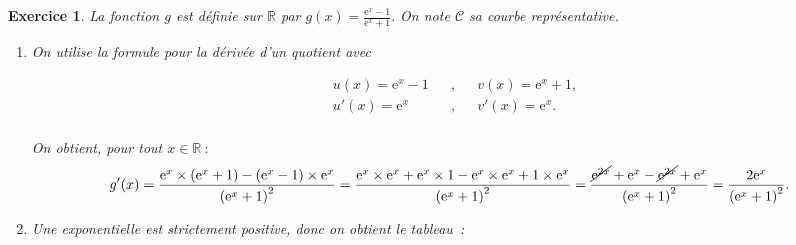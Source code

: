 \documentclass[10pt]{article}
\newtheorem{exo}{Exercice}
\begin{document}
\begin{exo}

La fonction $g$ est définie sur $\mathbb{R}$ par $g(x)=\frac{\text{e}^{x}-1}{\text{e}^{x}+1}.$ On note $\mathcal{C}$ sa courbe représentative.

\begin{enumerate}
\item On utilise la formule pour la dérivée d'un quotient avec

\begin{align*}
&u(x)=\text{e}^{x}-1&&,&& v(x)=\text{e}^{x}+1, \\
& u'(x)=\text{e}^{x}&&, &&v'(x)=\text{e}^{x}.\\
\end{align*}

On obtient, pour tout $x\in \mathbb{R}~:$
\[g'(x)=\frac{\text{e}^{x}\times\left(\text{e}^{x}+1\right)-(\text{e}^{x}-1)\times \text{e}^{x}}{\left(\text{e}^{x}+1\right)^2}=\frac{\text{e}^{x}\times \text{e}^{x}+\text{e}^{x}\times 1-\text{e}^{x}\times \text{e}^{x}+1\times \text{e}^{x}}{\left(\text{e}^{x}+1\right)^2}=\frac{\cancel{\text{e}^{2x}}+\text{e}^{x}-\cancel{\text{e}^{2x}}+\text{e}^{x}}{\left(\text{e}^{x}+1\right)^2}=\frac{2\text{e}^{x}}{\left(\text{e}^{x}+1\right)^2}.\]

\item Une exponentielle est strictement positive, donc on obtient le tableau~:


\end{enumerate}
\end{exo}
\end{document}

